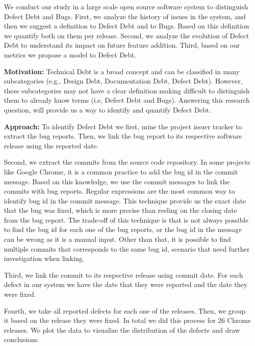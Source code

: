 We conduct our study in a large scale open source software system to distinguish Defect Debt and Bugs. First, we analyze the history of issues in the system, and then we suggest a definition to Defect Debt and to Bugs. Based on this definition we quantify  both on them per release. Second, we analyze the evolution of Defect Debt to understand its impact on future feature addition. Third, based on our metrics we propose a model to Defect Debt.

\vspace{3mm}
\noindent\rqi
\vspace{3mm}

\noindent\textbf{Motivation:} Technical Debt is a broad concept and can be classified in many subcategories (e.g., Design Debt, Documentation Debt, Defect Debt). However, these subcategories may not have a clear definition making difficult to distinguish them to already know terms (i.e, Defect Debt and Bugs). Answering this research question, will provide us a way to identify and quantify Defect Debt. 

\vspace{1mm}
\noindent\textbf{Approach:} To identify Defect Debt we first, mine the project issuer tracker to extract the bug reports. Then, we link the bug report to its respective software release using the reported date. 

Second, we extract the commits from the source code repository. In some projects like Google Chrome, it is a common practice to add the bug id in the commit message. Based on this knowledge, we use the commit messages to link the commits with bug reports. Regular expressions are the most common way to identify bug id in the commit message. This technique provide us the exact date that the bug was fixed, which is more precise than reeling on the closing date from the bug report. The trade-off of this technique is that is not always possible to find the bug id for each one of the bug reports, or the bug id in the message can be wrong as it is a manual input.  Other than that, it is possible to find multiple commits that corresponds to the same bug id, scenario that need further investigation when linking. 

Third, we link the commit to its respective release using commit date. For each defect in our system we have the date that they were reported and the date they were fixed. 

Fourth, we take all reported defects for each one of the releases. Then, we group it based on the release they were fixed. In total we did this process for 26 Chrome releases. We plot the data to visualize the distribution of the defects and draw conclusions. 

